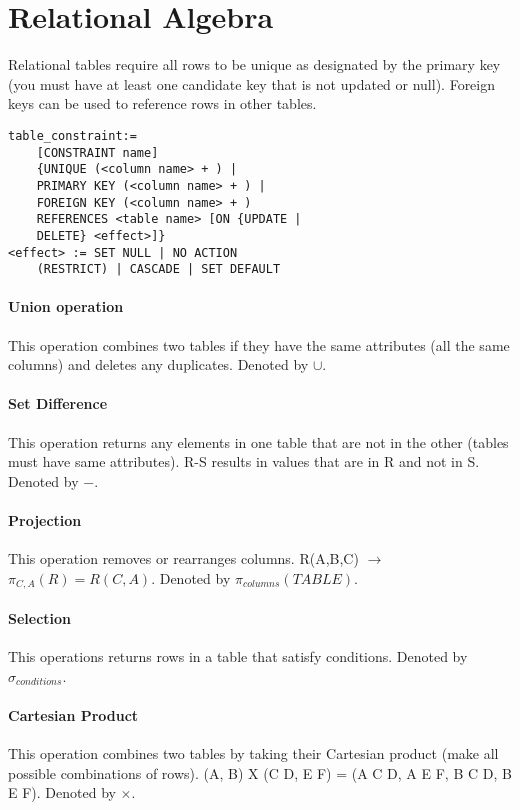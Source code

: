 \documentclass{article}
\begin{document}
\section*{Relational Algebra} %
\label{sec:relational_algebra}
Relational tables require all rows to be unique as designated by the primary key (you must have at least one candidate key that is not updated or null). Foreign keys can be used to reference rows in other tables.

\begin{verbatim}
table_constraint:=
    [CONSTRAINT name]
    {UNIQUE (<column name> + ) |
    PRIMARY KEY (<column name> + ) |
    FOREIGN KEY (<column name> + )
    REFERENCES <table name> [ON {UPDATE |
    DELETE} <effect>]}
<effect> := SET NULL | NO ACTION
    (RESTRICT) | CASCADE | SET DEFAULT
\end{verbatim}

\paragraph{Union operation} %
\label{par:union_operation}
This operation combines two tables if they have the same attributes (all the same columns) and deletes any duplicates. Denoted by $\cup$.
\paragraph{Set Difference} %
\label{par:set_difference}
This operation returns any elements in one table that are not in  the other (tables must have same attributes). R-S results in values that are in R and not in S. Denoted by $-$.
\paragraph{Projection} %
\label{par:projection}
This operation removes or rearranges columns. R(A,B,C) $\rightarrow$ $\pi_{C,A}(R) = R(C,A)$. Denoted by $\pi_{columns}(TABLE)$.
\paragraph{Selection} %
\label{par:selection}
This operations returns rows in a table that satisfy conditions. Denoted by $\sigma_{conditions}$.
\paragraph{Cartesian Product} %
\label{par:cartesian_product}
This operation combines two tables by taking their Cartesian product (make all possible combinations of rows). (A, B) X (C D, E F) = (A C D, A E F, B C D, B E F). Denoted by $\times$.
\end{document}

